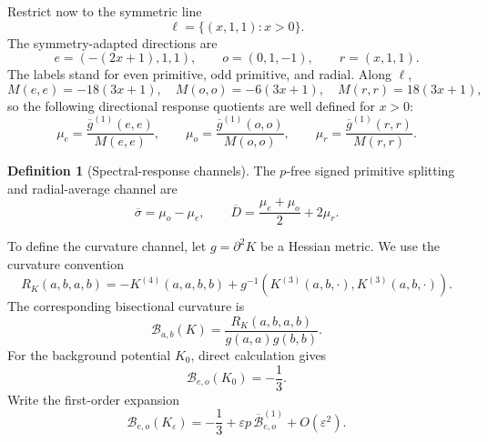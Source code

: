 \documentclass[11pt]{article}
\theoremstyle{definition}
\newtheorem{definition}[theorem]{Definition}
\theoremstyle{remark}
\newcommand{\cB}{\mathcal{B}}
\newcommand{\bg}{\overline{g}}
\newcommand{\bsigma}{\overline{\sigma}}
\newcommand{\bD}{\overline{D}}
\begin{document}
Restrict now to the symmetric line
\begin{equation}\label{eq:line}
 \ell=\{(x,1,1):x>0\}.
\end{equation}
The symmetry-adapted directions are
\begin{equation}\label{eq:directions}
 e=(-(2x+1),1,1),
 \qquad
 o=(0,1,-1),
 \qquad
 r=(x,1,1).
\end{equation}
The labels stand for even primitive, odd primitive, and radial. Along \(\ell\),
\begin{equation}\label{eq:Mnorms}
 M(e,e)=-18(3x+1),
 \quad
 M(o,o)=-6(3x+1),
 \quad
 M(r,r)=18(3x+1),
\end{equation}
so the following directional response quotients are well defined for \(x>0\):
\begin{equation}\label{eq:mudefs}
 \mu_e=\frac{\bg^{(1)}(e,e)}{M(e,e)},
 \qquad
 \mu_o=\frac{\bg^{(1)}(o,o)}{M(o,o)},
 \qquad
 \mu_r=\frac{\bg^{(1)}(r,r)}{M(r,r)}.
\end{equation}

\begin{definition}[Spectral-response channels]\label{def:spectralchannels}
The \(p\)-free signed primitive splitting and radial-average channel are
\begin{equation}\label{eq:channels}
 \bsigma=\mu_o-\mu_e,
 \qquad
 \bD=\frac{\mu_e+\mu_o}{2}+2\mu_r.
\end{equation}
\end{definition}

To define the curvature channel, let \(g=\partial^2K\) be a Hessian metric. We use the curvature convention
\begin{equation}\label{eq:Rconv}
 R_K(a,b,a,b)
 =-K^{(4)}(a,a,b,b)
 +g^{-1}\!\left(K^{(3)}(a,b,\cdot),K^{(3)}(a,b,\cdot)\right).
\end{equation}
The corresponding bisectional curvature is
\begin{equation}\label{eq:Bisectional}
 \cB_{a,b}(K)
 =\frac{R_K(a,b,a,b)}{g(a,a)g(b,b)}.
\end{equation}
For the background potential \(K_0\), direct calculation gives
\begin{equation}\label{eq:B0}
 \cB_{e,o}(K_0)=-\frac13.
\end{equation}
Write the first-order expansion
\begin{equation}\label{eq:Bexp}
 \cB_{e,o}(K_\varepsilon)
 =-\frac13+\varepsilon p\,\overline{\cB}^{(1)}_{e,o}+O(\varepsilon^2).
\end{equation}
\end{document}

